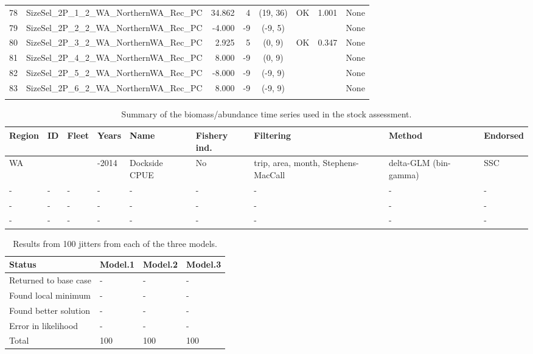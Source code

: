 \documentclass[12pt,]{article}
\begin{document}
\begin{landscape}
\begin{longtable}{rlrrcccl}
  78 & SizeSel\_2P\_1\_2\_WA\_NorthernWA\_Rec\_PC & 34.862 & 4 & (19, 36) & OK & 1.001 & None \\ 
  79 & SizeSel\_2P\_2\_2\_WA\_NorthernWA\_Rec\_PC & -4.000 & -9 & (-9, 5) &  &  & None \\ 
  80 & SizeSel\_2P\_3\_2\_WA\_NorthernWA\_Rec\_PC & 2.925 & 5 & (0, 9) & OK & 0.347 & None \\ 
  81 & SizeSel\_2P\_4\_2\_WA\_NorthernWA\_Rec\_PC & 8.000 & -9 & (0, 9) &  &  & None \\ 
  82 & SizeSel\_2P\_5\_2\_WA\_NorthernWA\_Rec\_PC & -8.000 & -9 & (-9, 9) &  &  & None \\ 
  83 & SizeSel\_2P\_6\_2\_WA\_NorthernWA\_Rec\_PC & 8.000 & -9 & (-9, 9) &  &  & None \\ 
   \hline
\hline
\label{tab:model_params}
\end{longtable}
\end{landscape}

\newpage

\begin{table}[ht]
\centering
\caption{Summary of the biomass/abundance
                                              time series used in the stock
                                              assessment.} 
\label{tab:Index_summary}
\begin{tabular}{>{\centering}p{.4in}>{\centering}p{.3in}>{\centering}p{.3in}>{\centering}p{.3in}>{\centering}p{.6in}>{\centering}p{.5in}>{\centering}p{.8in}>{\centering}p{.8in}>{\centering}p{.5in}}
  \hline
Region & ID & Fleet & Years & Name & Fishery ind. & Filtering & Method & Endorsed \\ 
  \hline
WA & 1 & 4 & 1981-2014 & Dockside CPUE & No & trip, area, month, Stephens-MacCall & delta-GLM (bin-gamma) & SSC \\ 
  - & - & - & - & - & - & - & - & - \\ 
  - & - & - & - & - & - & - & - & - \\ 
  - & - & - & - & - & - & - & - & - \\ 
   \hline
\end{tabular}
\end{table}

\newpage

\begin{table}[ht]
\centering
\caption{Results from 100 jitters from each of 
                                      the three models.} 
\label{tab:jitter}
\begin{tabular}{llll}
  \hline
Status & Model.1 & Model.2 & Model.3 \\ 
  \hline
Returned to base case & - & - & - \\ 
  Found local minimum & - & - & - \\ 
  Found better solution & - & - & - \\ 
  Error in likelihood & - & - & - \\ 
  Total & 100 & 100 & 100 \\ 
   \hline
\end{tabular}
\end{table}
\end{document}
